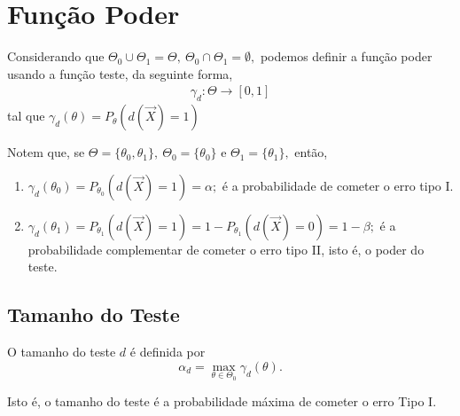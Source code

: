 \documentclass[12pt]{beamer}
\begin{document}
\section{Função Poder}
\begin{frame}{}
\begin{definicao}
\justifying
Considerando que $\Theta_{0}\cup\Theta_{1}=\Theta,~\Theta_{0}\cap\Theta_{1}=\emptyset,$ podemos definir a função poder usando a função teste, da seguinte forma,  
\begin{align*}
    \gamma_{d}:\Theta\rightarrow [0,1]
\end{align*}
tal que $\gamma_{d}(\theta)=P_{\theta}(d(\vec{X})=1)$
\end{definicao}
\pause
\begin{block}{}
\justifying
    Notem que, se $\Theta=\{\theta_{0},\theta_{1}\},~\Theta_{0}=\{\theta_{0}\}$ e $\Theta_{1}=\{\theta_{1}\},$ então,
\begin{enumerate}
    \item $\gamma_{d}(\theta_{0})=P_{\theta_{0}}(d(\vec{X})=1)=\alpha;$ é a probabilidade de cometer o erro tipo I.
    \item $\gamma_{d}(\theta_{1})=P_{\theta_{1}}(d(\vec{X})=1)=1-P_{\theta_{1}}(d(\vec{X})=0)=1-\beta;$ é a probabilidade complementar de cometer o erro tipo II, isto é, o poder do teste.
\end{enumerate}
\end{block}
\end{frame}

\subsection{Tamanho do Teste}
\begin{frame}{}
\begin{definicao}
\justifying 
O tamanho do teste $d$ é definida por 
$$\alpha_{d}=\max_{\theta\in \Theta_{0}}\gamma_{d}(\theta).$$
\end{definicao}
\pause
\begin{block}{}
\justifying
Isto é, o tamanho do teste é a probabilidade máxima de cometer o erro Tipo I.
\end{block}
\end{frame}
\end{document}
